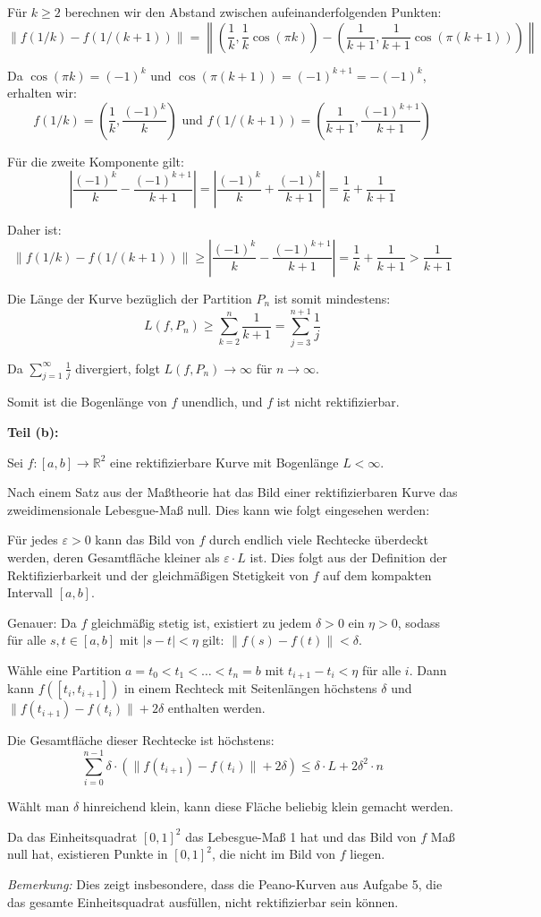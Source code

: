\documentclass{article}
\newcommand{\R}{\mathbb{R}}
\theoremstyle{definition}
\begin{document}
Für $k \geq 2$ berechnen wir den Abstand zwischen aufeinanderfolgenden Punkten:
$$\|f(1/k) - f(1/(k+1))\| = \left\|\left(\frac{1}{k}, \frac{1}{k}\cos(\pi k)\right) - \left(\frac{1}{k+1}, \frac{1}{k+1}\cos(\pi(k+1))\right)\right\|$$

Da $\cos(\pi k) = (-1)^k$ und $\cos(\pi(k+1)) = (-1)^{k+1} = -(-1)^k$, erhalten wir:
$$f(1/k) = \left(\frac{1}{k}, \frac{(-1)^k}{k}\right) \text{ und } f(1/(k+1)) = \left(\frac{1}{k+1}, \frac{(-1)^{k+1}}{k+1}\right)$$

Für die zweite Komponente gilt:
$$\left|\frac{(-1)^k}{k} - \frac{(-1)^{k+1}}{k+1}\right| = \left|\frac{(-1)^k}{k} + \frac{(-1)^k}{k+1}\right| = \frac{1}{k} + \frac{1}{k+1}$$

Daher ist:
$$\|f(1/k) - f(1/(k+1))\| \geq \left|\frac{(-1)^k}{k} - \frac{(-1)^{k+1}}{k+1}\right| = \frac{1}{k} + \frac{1}{k+1} > \frac{1}{k+1}$$

Die Länge der Kurve bezüglich der Partition $P_n$ ist somit mindestens:
$$L(f, P_n) \geq \sum_{k=2}^{n} \frac{1}{k+1} = \sum_{j=3}^{n+1} \frac{1}{j}$$

Da $\sum_{j=1}^{\infty} \frac{1}{j}$ divergiert, folgt $L(f, P_n) \to \infty$ für $n \to \infty$.

Somit ist die Bogenlänge von $f$ unendlich, und $f$ ist nicht rektifizierbar.

\textbf{Teil (b):}

Sei $f:[a,b] \to \R^2$ eine rektifizierbare Kurve mit Bogenlänge $L < \infty$.

Nach einem Satz aus der Maßtheorie hat das Bild einer rektifizierbaren Kurve das zweidimensionale Lebesgue-Maß null. Dies kann wie folgt eingesehen werden:

Für jedes $\varepsilon > 0$ kann das Bild von $f$ durch endlich viele Rechtecke überdeckt werden, deren Gesamtfläche kleiner als $\varepsilon \cdot L$ ist. Dies folgt aus der Definition der Rektifizierbarkeit und der gleichmäßigen Stetigkeit von $f$ auf dem kompakten Intervall $[a,b]$.

Genauer: Da $f$ gleichmäßig stetig ist, existiert zu jedem $\delta > 0$ ein $\eta > 0$, sodass für alle $s,t \in [a,b]$ mit $|s-t| < \eta$ gilt: $\|f(s) - f(t)\| < \delta$.

Wähle eine Partition $a = t_0 < t_1 < \ldots < t_n = b$ mit $t_{i+1} - t_i < \eta$ für alle $i$. Dann kann $f([t_i, t_{i+1}])$ in einem Rechteck mit Seitenlängen höchstens $\delta$ und $\|f(t_{i+1}) - f(t_i)\| + 2\delta$ enthalten werden.

Die Gesamtfläche dieser Rechtecke ist höchstens:
$$\sum_{i=0}^{n-1} \delta \cdot (\|f(t_{i+1}) - f(t_i)\| + 2\delta) \leq \delta \cdot L + 2\delta^2 \cdot n$$

Wählt man $\delta$ hinreichend klein, kann diese Fläche beliebig klein gemacht werden.

Da das Einheitsquadrat $[0,1]^2$ das Lebesgue-Maß 1 hat und das Bild von $f$ Maß null hat, existieren Punkte in $[0,1]^2$, die nicht im Bild von $f$ liegen.

\textit{Bemerkung:} Dies zeigt insbesondere, dass die Peano-Kurven aus Aufgabe 5, die das gesamte Einheitsquadrat ausfüllen, nicht rektifizierbar sein können.
\end{document}
